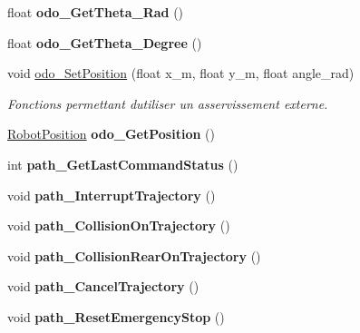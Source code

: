 \begin{DoxyCompactItemize}
float {\bfseries odo\+\_\+\+Get\+Theta\+\_\+\+Rad} ()
\item 
\mbox{\label{classAsservDriver_af764eb227ab106c4dde5c4642cf42e6e}} 
float {\bfseries odo\+\_\+\+Get\+Theta\+\_\+\+Degree} ()
\item 
\mbox{\label{classAsservDriver_a036a5d7db2270ee5d388f0b6feaa253b}} 
void \hyperlink{classAsservDriver_a036a5d7db2270ee5d388f0b6feaa253b}{odo\+\_\+\+Set\+Position} (float x\+\_\+m, float y\+\_\+m, float angle\+\_\+rad)
\begin{DoxyCompactList}\small\item\em Fonctions permettant d\textquotesingle{}utiliser un asservissement externe. \end{DoxyCompactList}\item 
\mbox{\label{classAsservDriver_a0a62fbec28bfc5510eb75b6ad434baed}} 
\hyperlink{structRobotPosition}{Robot\+Position} {\bfseries odo\+\_\+\+Get\+Position} ()
\item 
\mbox{\label{classAsservDriver_ac4b8627777e76c145265a8e988852484}} 
int {\bfseries path\+\_\+\+Get\+Last\+Command\+Status} ()
\item 
\mbox{\label{classAsservDriver_affc4e315cdd03c826cea17114d02a19c}} 
void {\bfseries path\+\_\+\+Interrupt\+Trajectory} ()
\item 
\mbox{\label{classAsservDriver_a6af616f39706df060f1b81b2047c7a7f}} 
void {\bfseries path\+\_\+\+Collision\+On\+Trajectory} ()
\item 
\mbox{\label{classAsservDriver_a370b2f287b352211c07a023edcb63bc7}} 
void {\bfseries path\+\_\+\+Collision\+Rear\+On\+Trajectory} ()
\item 
\mbox{\label{classAsservDriver_a7f18af77a8524e09f8c9b024d4f0e4b8}} 
void {\bfseries path\+\_\+\+Cancel\+Trajectory} ()
\item 
\mbox{\label{classAsservDriver_aa54769b7bbe83fefa64925aa60089096}} 
void {\bfseries path\+\_\+\+Reset\+Emergency\+Stop} ()
\item 

\end{DoxyCompactItemize}
